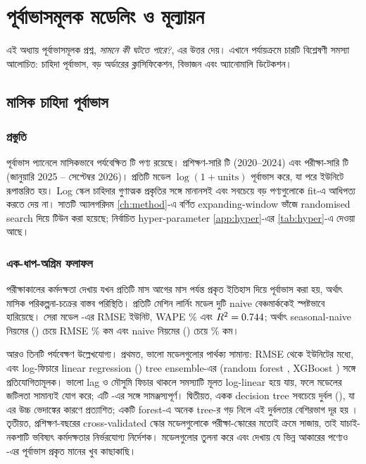 \chapter{পূর্বাভাসমূলক মডেলিং ও মূল্যায়ন}\label{ch:models}

এই অধ্যায় পূর্বাভাসমূলক প্রশ্ন, \emph{সামনে কী ঘটতে পারে?}, এর উত্তর দেয়। এখানে পর্যায়ক্রমে চারটি বিশ্লেষণী সমস্যা আলোচিত: চাহিদা
পূর্বাভাস, বড় অর্ডারের ক্লাসিফিকেশন, বিভাজন এবং অ্যানোমালি ডিটেকশন।

\section{মাসিক চাহিদা পূর্বাভাস}
\subsection{প্রস্তুতি}
পূর্বাভাস প্যানেলে মাসিকভাবে পর্যবেক্ষিত \PanelSeries টি পণ্য রয়েছে। প্রশিক্ষণ-সারি \PanelTrain টি (2020--2024) এবং পরীক্ষা-সারি
\PanelTest টি (জানুয়ারি 2025 -- সেপ্টেম্বর 2026)। প্রতিটি মডেল $\log(1+\text{units})$ পূর্বাভাস করে, যা পরে ইউনিটে রূপান্তরিত হয়।
Log স্কেল চাহিদার গুণাত্মক প্রকৃতির সঙ্গে মানানসই এবং সবচেয়ে বড় পণ্যগুলোকে fit-এ আধিপত্য করতে দেয় না। সাতটি অ্যালগরিদম
\cref{ch:method}-এ বর্ণিত expanding-window ভাঁজে randomised search দিয়ে টিউন করা হয়েছে; নির্বাচিত hyper-parameter
\cref{app:hyper}-এর \cref{tab:hyper}-এ দেওয়া আছে।

\subsection{এক-ধাপ-অগ্রিম ফলাফল}
 পরীক্ষাকালের কর্মদক্ষতা দেখায় যখন প্রতিটি মাস আগের মাস পর্যন্ত প্রকৃত ইতিহাস দিয়ে পূর্বাভাস করা হয়, অর্থাৎ মাসিক
পরিকল্পনা-চক্রের বাস্তব পরিস্থিতি। প্রতিটি মেশিন লার্নিং মডেল দুটি naive বেঞ্চমার্ককেই স্পষ্টভাবে হারিয়েছে। সেরা মডেল \BestReg-এর
RMSE \BestRegRMSE ইউনিট, WAPE \BestRegWAPE\% এবং $R^2=0.744$; অর্থাৎ seasonal-naive নিয়মের (\SNaiveRMSE) চেয়ে RMSE
\GainVsSNaive\% কম এবং naive নিয়মের (\NaiveRMSE) চেয়ে \GainVsNaive\% কম।



আরও তিনটি পর্যবেক্ষণ উল্লেখযোগ্য। প্রথমত, ভালো মডেলগুলোর পার্থক্য সামান্য: RMSE \BestRegRMSE থেকে \WorstRegRMSE ইউনিটের মধ্যে,
এবং log-ফিচারে linear regression (\LinRMSE) tree ensemble-এর (random forest \RFRMSE, XGBoost \XGBRMSE) সঙ্গে প্রতিযোগিতামূলক।
ভালো lag ও মৌসুমি ফিচার থাকলে সমস্যাটি মূলত log-linear হয়ে যায়, ফলে মডেলের জটিলতা সামান্যই যোগ করে; এটি
\citet{makridakis2018}-এর সঙ্গে সামঞ্জস্যপূর্ণ। দ্বিতীয়ত, একক decision tree সবচেয়ে দুর্বল (\DTRMSE), যা এর উচ্চ ভেদাঙ্কের কারণে
প্রত্যাশিত; একটি forest-এ অনেক tree-র গড় নিলে এই দুর্বলতার বেশিরভাগ দূর হয় \citep{breiman2001}। তৃতীয়ত, প্রশিক্ষণ-বছরের
cross-validated স্কোর মডেলগুলোকে পরীক্ষা-স্কোরের মতোই ক্রমে সাজায়, তাই যাচাই-নকশাটি ভবিষ্যৎ কর্মদক্ষতার নির্ভরযোগ্য নির্দেশক।
 মডেলগুলোর তুলনা করে এবং দেখায় যে ভিন্ন আকারের পণ্যেও \BestReg-এর পূর্বাভাস প্রকৃত মানের খুব কাছাকাছি।

